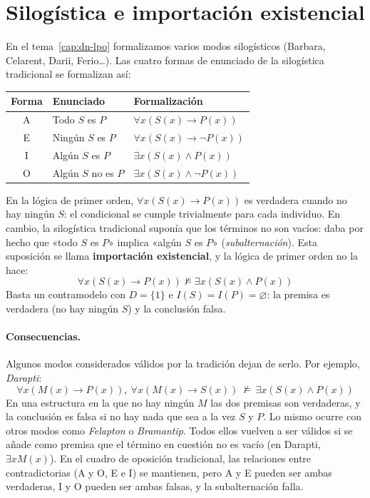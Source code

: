 \section{Silogística e importación existencial}\label{sec:importacion}

En el tema~\ref{cap:dn-lpo} formalizamos varios modos silogísticos (Barbara, Celarent, Darii, Ferio\ldots). Las cuatro formas de enunciado de la silogística tradicional se formalizan así:
\begin{center}
\renewcommand{\arraystretch}{1.25}
\begin{tabular}{|c|l|l|}
\hline
\textbf{Forma} & \textbf{Enunciado} & \textbf{Formalización} \\
\hline
A & Todo $S$ es $P$ & $\forall x (S(x) \to P(x))$ \\
E & Ningún $S$ es $P$ & $\forall x (S(x) \to \neg P(x))$ \\
I & Algún $S$ es $P$ & $\exists x (S(x) \land P(x))$ \\
O & Algún $S$ no es $P$ & $\exists x (S(x) \land \neg P(x))$ \\
\hline
\end{tabular}
\end{center}

En la lógica de primer orden, $\forall x (S(x) \to P(x))$ es verdadera cuando no hay ningún $S$: el condicional se cumple trivialmente para cada individuo. En cambio, la silogística tradicional suponía que los términos no son vacíos: daba por hecho que «todo $S$ es $P$» implica «algún $S$ es $P$» (\emph{subalternación}). Esta suposición se llama \textbf{importación existencial}, y la lógica de primer orden no la hace:
\[
\forall x (S(x) \to P(x)) \not\models \exists x (S(x) \land P(x))
\]
Basta un contramodelo con $D = \{1\}$ e $I(S) = I(P) = \varnothing$: la premisa es verdadera (no hay ningún $S$) y la conclusión falsa.

\paragraph{Consecuencias.} Algunos modos considerados válidos por la tradición dejan de serlo. Por ejemplo, \emph{Darapti}:
\[
\forall x (M(x) \to P(x)), \ \forall x (M(x) \to S(x)) \ \not\models \ \exists x (S(x) \land P(x))
\]
En una estructura en la que no hay ningún $M$ las dos premisas son verdaderas, y la conclusión es falsa si no hay nada que sea a la vez $S$ y $P$. Lo mismo ocurre con otros modos como \emph{Felapton} o \emph{Bramantip}. Todos ellos vuelven a ser válidos si se añade como premisa que el término en cuestión no es vacío (en Darapti, $\exists x M(x)$). En el cuadro de oposición tradicional, las relaciones entre contradictorias (A y O, E e I) se mantienen, pero A y E pueden ser ambas verdaderas, I y O pueden ser ambas falsas, y la subalternación falla.

